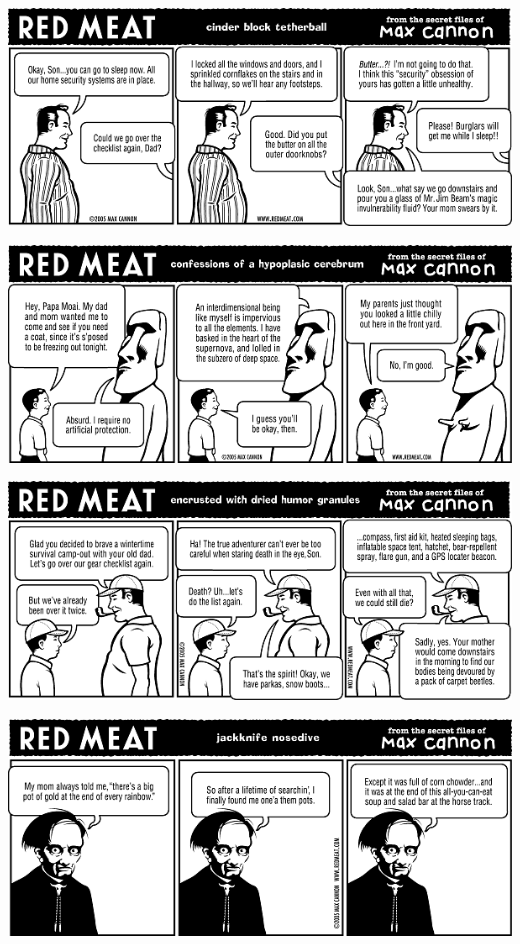 \documentclass[a4paper,twoside,11pt]{article}
\begin{document}
\includegraphics[width=\textwidth]{redmeat_2005-01-18.png}



\includegraphics[width=\textwidth]{redmeat_2005-01-25.png}



\includegraphics[width=\textwidth]{redmeat_2005-02-01.png}



\includegraphics[width=\textwidth]{redmeat_2005-02-08.png}
\end{document}

